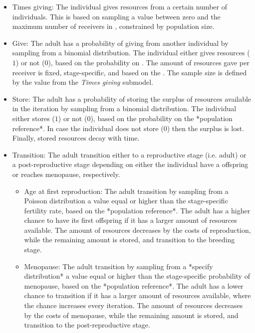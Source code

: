 \documentclass{article}
\begin{document}
\begin{itemize}
    \item Times giving: The individual gives resources from a certain number of individuals. This is based on sampling a value between zero and the maximum number of receivers in \cite{gurven2004give}, constrained by population size.
    \item Give: The adult has a probability of giving from another individual by sampling from a binomial distribution. The individual either gives resources ($1$) or not ($0$), based on the probability on \cite{gurven2004give}. The amount of resources gave per receiver is fixed, stage-specific, and based on the \cite{gurven2004give}. The sample size is defined by the value from the \emph{Times giving} submodel. 
    \item Store: The adult has a probability of storing the surplus of resources available in the iteration by sampling from a binomial distribution. The individual either stores ($1$) or not ($0$), based on the probability on the *population reference*. In case the individual does not store ($0$) then the surplus is lost. Finally, stored resources decay with time.
    \item Transition: The adult transition either to a reproductive stage (i.e. adult) or a post-reproductive stage depending on either the individual have a offspring or reaches menopause, respectively.
    \begin{itemize}
        \item Age at first reproduction: The adult transition by sampling from a Poisson distribution a value equal or higher than the stage-specific fertility rate, based on the *population reference*. The adult has a higher chance to have its first offspring if it has a larger amount of resources available. The amount of resources decreases by the costs of reproduction, while the remaining amount is stored, and transition to the breeding stage.
        \item Menopause: The adult transition by sampling from a *specify distribution* a value equal or higher than the stage-specific probability of menopause, based on the *population reference*. The adult has a lower chance to transition if it has a larger amount of resources available, where the chance increases every iteration. The amount of resources decreases by the costs of menopause, while the remaining amount is stored, and transition to the post-reproductive stage.
    \end{itemize}
\end{itemize}
\end{document}
